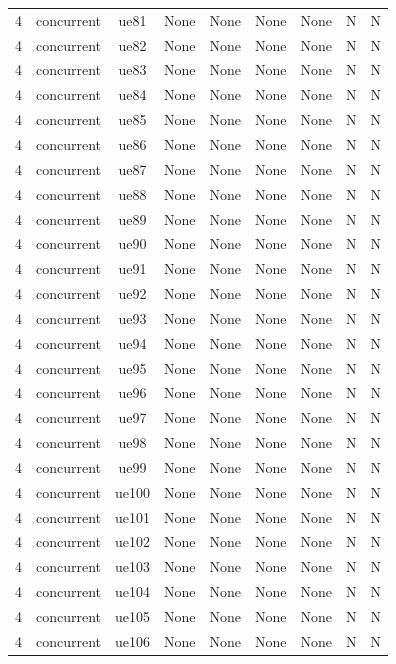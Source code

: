 \begin{table}[ht]
\begin{tabular}{|c|c|c|c|c|c|c|c|c|}
4 & concurrent & ue81 & None & None & None & None & N & N \\
4 & concurrent & ue82 & None & None & None & None & N & N \\
4 & concurrent & ue83 & None & None & None & None & N & N \\
4 & concurrent & ue84 & None & None & None & None & N & N \\
4 & concurrent & ue85 & None & None & None & None & N & N \\
4 & concurrent & ue86 & None & None & None & None & N & N \\
4 & concurrent & ue87 & None & None & None & None & N & N \\
4 & concurrent & ue88 & None & None & None & None & N & N \\
4 & concurrent & ue89 & None & None & None & None & N & N \\
4 & concurrent & ue90 & None & None & None & None & N & N \\
4 & concurrent & ue91 & None & None & None & None & N & N \\
4 & concurrent & ue92 & None & None & None & None & N & N \\
4 & concurrent & ue93 & None & None & None & None & N & N \\
4 & concurrent & ue94 & None & None & None & None & N & N \\
4 & concurrent & ue95 & None & None & None & None & N & N \\
4 & concurrent & ue96 & None & None & None & None & N & N \\
4 & concurrent & ue97 & None & None & None & None & N & N \\
4 & concurrent & ue98 & None & None & None & None & N & N \\
4 & concurrent & ue99 & None & None & None & None & N & N \\
4 & concurrent & ue100 & None & None & None & None & N & N \\
4 & concurrent & ue101 & None & None & None & None & N & N \\
4 & concurrent & ue102 & None & None & None & None & N & N \\
4 & concurrent & ue103 & None & None & None & None & N & N \\
4 & concurrent & ue104 & None & None & None & None & N & N \\
4 & concurrent & ue105 & None & None & None & None & N & N \\
4 & concurrent & ue106 & None & None & None & None & N & N \\

\end{tabular}
\end{table}
